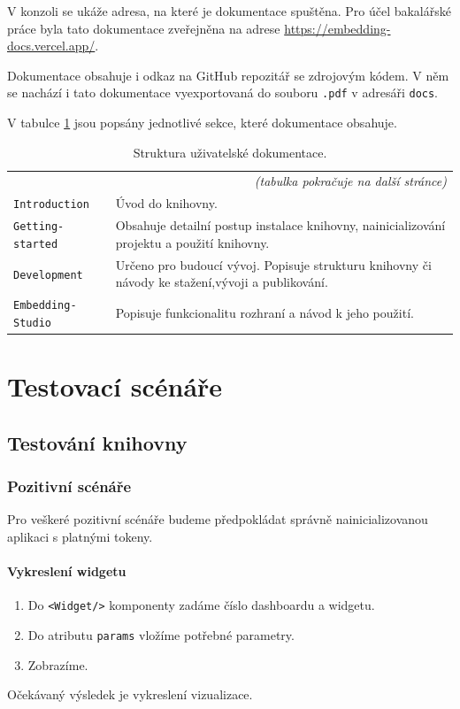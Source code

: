 \documentclass[czech, bc, kiv, he, iso690numb]{fasthesis}
\begin{document}
V konzoli se ukáže adresa, na které je dokumentace spuštěna. Pro účel bakalářské práce byla tato dokumentace
zveřejněna na adrese \url{https://embedding-docs.vercel.app/}. 

Dokumentace obsahuje i odkaz na GitHub repozitář se zdrojovým kódem. V něm se nachází i tato dokumentace vyexportovaná do souboru \texttt{.pdf} v adresáři \texttt{docs}. 

V tabulce \ref{tab:docsTabs} jsou popsány jednotlivé sekce, které dokumentace obsahuje.

\begin{center}
	\begin{longtable}{p{}p{}}
	\caption{Struktura uživatelské dokumentace.}
	\label{tab:docsTabs}\\
	\toprule[1.5pt]
	\endhead
	\midrule
	\multicolumn{2}{r}{\textit{(tabulka pokračuje na další stránce)}}\\
	\endfoot
	\bottomrule[1.5pt]
	\endlastfoot
	\verb"Introduction" & Úvod do knihovny. \\
	\midrule
	\verb"Getting-started" & Obsahuje detailní postup instalace knihovny, nainicializování projektu a použití knihovny. \\
	\midrule
	\verb"Development" & Určeno pro budoucí vývoj. Popisuje strukturu knihovny či návody ke stažení,vývoji a publikování.\\
	\midrule
	\verb"Embedding-Studio" & Popisuje funkcionalitu rozhraní a návod k jeho použití. \\
	\end{longtable}
\end{center}

\chapter{Testovací scénáře}\label{app:testCases}
\section{Testování knihovny}
\subsection{Pozitivní scénáře}
Pro veškeré pozitivní scénáře budeme předpokládat správně nainicializovanou aplikaci s platnými tokeny.
\subsubsection{Vykreslení widgetu}
\begin{enumerate}
	\item Do \texttt{<Widget/>} komponenty zadáme číslo dashboardu a widgetu.
	\item Do atributu \texttt{params} vložíme potřebné parametry.
	\item Zobrazíme.
\end{enumerate}
Očekávaný výsledek je vykreslení vizualizace.
\end{document}
